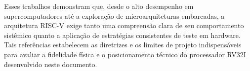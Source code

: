 Esses trabalhos demonstram que, desde o alto desempenho em supercomputadores até a exploração de microarquiteturas embarcadas, a arquitetura RISC-V exige tanto uma compreensão clara de seu comportamento sistêmico quanto a aplicação de estratégias consistentes de teste em hardware. Tais referências estabelecem as diretrizes e os limites de projeto indispensáveis para avaliar a fidelidade física e o posicionamento técnico do processador RV32I desenvolvido neste documento.